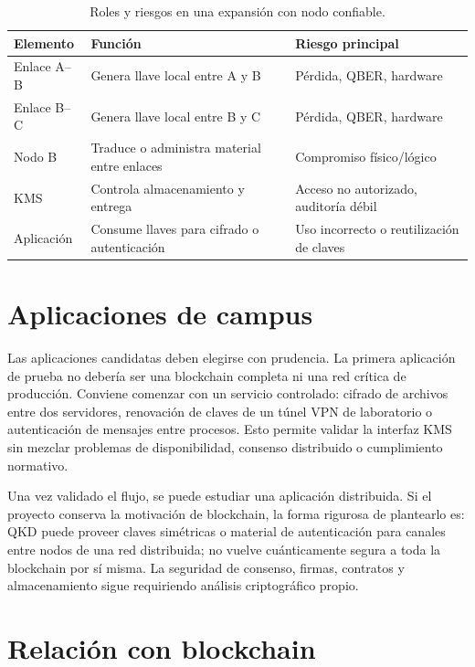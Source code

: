 \begin{table}[H]
  \centering
  \begin{tabularx}{\textwidth}{p{}XX}
    \toprule
    Elemento & Función & Riesgo principal \\
    \midrule
    Enlace A--B & Genera llave local entre A y B & Pérdida, QBER, hardware \\
    Enlace B--C & Genera llave local entre B y C & Pérdida, QBER, hardware \\
    Nodo B & Traduce o administra material entre enlaces & Compromiso físico/lógico \\
    KMS & Controla almacenamiento y entrega & Acceso no autorizado, auditoría débil \\
    Aplicación & Consume llaves para cifrado o autenticación & Uso incorrecto o reutilización de claves \\
    \bottomrule
  \end{tabularx}
  \caption{Roles y riesgos en una expansión con nodo confiable.}
  \label{tab:trusted_relay}
\end{table}

\section{Aplicaciones de campus}

Las aplicaciones candidatas deben elegirse con prudencia. La primera aplicación de prueba no debería ser una blockchain completa ni una red crítica de producción. Conviene comenzar con un servicio controlado: cifrado de archivos entre dos servidores, renovación de claves de un túnel VPN de laboratorio o autenticación de mensajes entre procesos. Esto permite validar la interfaz KMS sin mezclar problemas de disponibilidad, consenso distribuido o cumplimiento normativo.

Una vez validado el flujo, se puede estudiar una aplicación distribuida. Si el proyecto conserva la motivación de blockchain, la forma rigurosa de plantearlo es: QKD puede proveer claves simétricas o material de autenticación para canales entre nodos de una red distribuida; no vuelve cuánticamente segura a toda la blockchain por sí misma. La seguridad de consenso, firmas, contratos y almacenamiento sigue requiriendo análisis criptográfico propio.

\section{Relación con blockchain}

